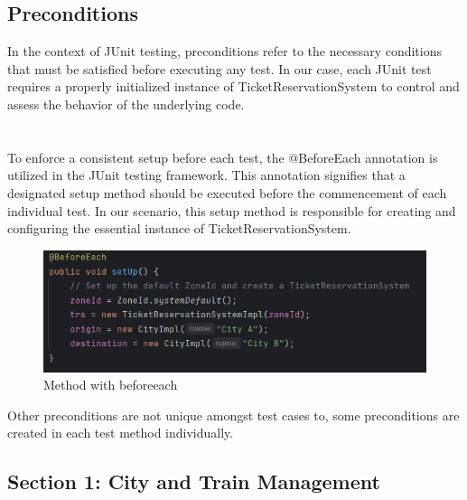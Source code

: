 \documentclass{article}
\begin{document}
 \subsection{Preconditions}
In the context of JUnit testing, preconditions refer to the necessary conditions that must be satisfied before executing any test. In our case, each JUnit test requires a properly initialized instance of TicketReservationSystem to control and assess the behavior of the underlying code. \\\\\\
To enforce a consistent setup before each test, the @BeforeEach annotation is utilized in the JUnit testing framework. This annotation signifies that a designated setup method should be executed before the commencement of each individual test. In our scenario, this setup method is responsible for creating and configuring the essential instance of TicketReservationSystem.
 \bigskip

\begin{figure}[h]
  \centering
  \includegraphics[width=1.0\textwidth]{pictures/T-B.png}
  \caption{Method with beforeeach}
  \label{fig:your_label}
\end{figure}

Other preconditions are not unique amongst test cases to, some preconditions are created in each test method individually.

\pagebreak

\subsection{Section 1: City and Train Management}
\end{document}
